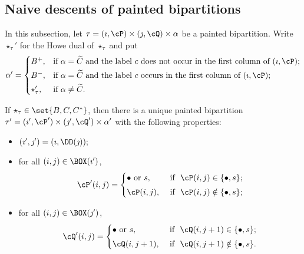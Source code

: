 \documentclass[ssunip]{subfiles}
\begin{document}
   
 \subsection{Naive descents of painted bipartitions }
\def\bipartl{\mathrm{bi\cP_L}}
\def\bipartr{\mathrm{bi\cP_R}}
\def\dsdiagl{\mathrm{DS_L}}
\def\dsdiagr{\mathrm{DS_R}}
\def\DDl{\eDD_\mathrm{L}}
\def\DDr{\eDD_\mathrm{R}}


In this subsection, let $\tau=(\imath,\cP)\times (\jmath,\cQ)\times \alpha$ be a  painted bipartition. Write $\star_\tau'$ for the Howe dual of $\star_\tau$ and put
  \begin{equation} \label{eq:def.alphap}
    \alpha'=\begin{cases} B^+,
  & \textrm{if $\alpha=\widetilde{C}$ and the label $c$ does not occur in the first column of $(\imath, \cP)$}; \smallskip \\
  B^-,
  & \textrm{if $\alpha=\widetilde{C}$ and the label $c$ occurs in the first column of $(\imath, \cP)$}; \smallskip \\
  \star_\tau', & \textrm{if $\alpha\neq \widetilde C$}. 
  \end{cases}
  \end{equation}
\begin{lem}\label{lemDDn1}
  If $\star_\tau \in \set{B,C,C^*}$, then there is a unique painted bipartition $\tau'= (\imath',\cP')\times (\jmath',\cQ')\times \alpha'$ with the following properties:
  \begin{itemize}
        \item $
   (\imath',\jmath')= (\imath,\DD(\jmath)); \smallskip
   $
   \item for all $(i,j)\in \BOX(\imath')$,
   \[
     \cP'(i,j)=\begin{cases}   
    \bullet \textrm{ or } s,&\textrm{ if  $\ \cP(i,j)\in \{\bullet, s\}$;} \smallskip \\
  \cP(i,j),& \textrm{ if $\ \cP(i,j)\notin \{\bullet, s\}$};\end{cases}
   \]
   \item for all $(i,j)\in \BOX(\jmath')$,
   \[
     \cQ'(i,j)=\begin{cases}   
    \bullet \textrm{ or } s,&\textrm{ if  $\ \cQ(i,j+1)\in \{\bullet, s\}$;} \smallskip \\
  \cQ(i,j+1), & \textrm{ if $\ \cQ(i,j+1)\notin \{\bullet, s\}$}.  \end{cases}
   \]
    \end{itemize} 
    \end{lem}
    
\end{document}
